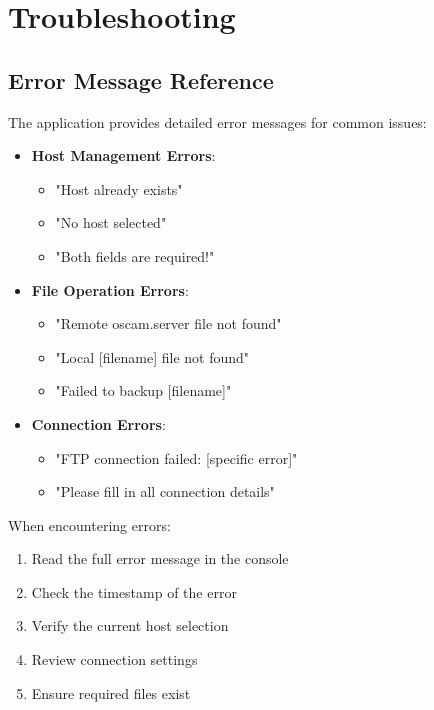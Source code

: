 \documentclass[a4paper,11pt]{report}
\begin{document}
\chapter{Troubleshooting}

\section{Error Message Reference}
The application provides detailed error messages for common issues:

\begin{itemize}
    \item \textbf{Host Management Errors}:
    \begin{itemize}
        \item "Host already exists"
        \item "No host selected"
        \item "Both fields are required!"
    \end{itemize}

    \item \textbf{File Operation Errors}:
    \begin{itemize}
        \item "Remote oscam.server file not found"
        \item "Local [filename] file not found"
        \item "Failed to backup [filename]"
    \end{itemize}

    \item \textbf{Connection Errors}:
    \begin{itemize}
        \item "FTP connection failed: [specific error]"
        \item "Please fill in all connection details"
    \end{itemize}
\end{itemize}

\begin{procedurebox}
When encountering errors:
\begin{enumerate}
    \item Read the full error message in the console
    \item Check the timestamp of the error
    \item Verify the current host selection
    \item Review connection settings
    \item Ensure required files exist
\end{enumerate}
\end{procedurebox}
\end{document}
